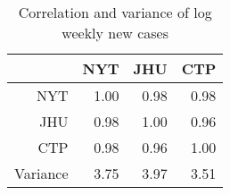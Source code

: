 \begin{table}[ht]
\centering
\begin{tabular}{rrrr}
  \hline
 & NYT & JHU & CTP \\ 
  \hline
NYT & 1.00 & 0.98 & 0.98 \\ 
  JHU & 0.98 & 1.00 & 0.96 \\ 
  CTP & 0.98 & 0.96 & 1.00 \\ 
  Variance & 3.75 & 3.97 & 3.51 \\ 
   \hline
\end{tabular}
\caption{Correlation and variance of log weekly new cases\label{tab:weekcasecor}} 
\end{table}
